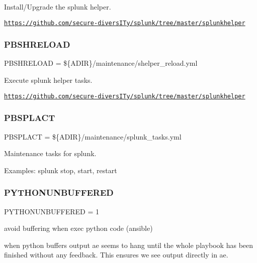 Install/\+Upgrade the splunk helper. 

\href{https://github.com/secure-diversITy/splunk/tree/master/splunkhelper}{\tt https\+://github.\+com/secure-\/divers\+I\+Ty/splunk/tree/master/splunkhelper} \mbox{\label{ansible__engine_8sh_a5abc6709ccffb498c492099b1770c0d6}} 
\subsubsection{\texorpdfstring{P\+B\+S\+H\+R\+E\+L\+O\+AD}{PBSHRELOAD}}
{\footnotesize\ttfamily P\+B\+S\+H\+R\+E\+L\+O\+AD = \$\{A\+D\+IR\}/maintenance/shelper\+\_\+reload.\+yml}



Execute splunk helper tasks. 

\href{https://github.com/secure-diversITy/splunk/tree/master/splunkhelper}{\tt https\+://github.\+com/secure-\/divers\+I\+Ty/splunk/tree/master/splunkhelper} \mbox{\label{ansible__engine_8sh_a07a65ca55f4f8bec6ba69c3d4f05db1c}} 
\subsubsection{\texorpdfstring{P\+B\+S\+P\+L\+A\+CT}{PBSPLACT}}
{\footnotesize\ttfamily P\+B\+S\+P\+L\+A\+CT = \$\{A\+D\+IR\}/maintenance/splunk\+\_\+tasks.\+yml}



Maintenance tasks for splunk. 

Examples\+: splunk stop, start, restart \mbox{\label{ansible__engine_8sh_af6d5a9916e4dc573ceb5dcc099e131a3}} 
\subsubsection{\texorpdfstring{P\+Y\+T\+H\+O\+N\+U\+N\+B\+U\+F\+F\+E\+R\+ED}{PYTHONUNBUFFERED}}
{\footnotesize\ttfamily P\+Y\+T\+H\+O\+N\+U\+N\+B\+U\+F\+F\+E\+R\+ED = 1}



avoid buffering when exec python code (ansible) 

when python buffers output ae seems to hang until the whole playbook has been finished without any feedback. This ensures we see output directly in ae. 